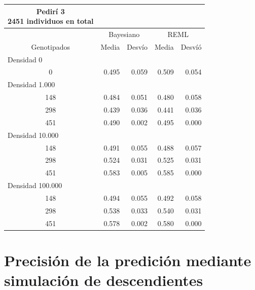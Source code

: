 \documentclass[11pt,spanish,a4paper,oneside,]{book} %
\begin{document}
\begin{longtable}{crrrr}
\caption*{
{\large Pedirí 3} \\ 
{\small 2451 individuos en total}
} \\ 
\toprule
 & \multicolumn{2}{c}{Bayesiano} & \multicolumn{2}{c}{REML} \\ 
 \cmidrule(lr){2-3} \cmidrule(lr){4-5}
Genotipados & Media & Desvío & Media & Desvíó \\ 
\midrule
\multicolumn{1}{l}{Densidad 0} \\ 
\midrule
0 & 0.495 & 0.059 & 0.509 & 0.054 \\ 
\midrule
\multicolumn{1}{l}{Densidad 1.000} \\ 
\midrule
148 & 0.484 & 0.051 & 0.480 & 0.058 \\ 
298 & 0.439 & 0.036 & 0.441 & 0.036 \\ 
451 & 0.490 & 0.002 & 0.495 & 0.000 \\ 
\midrule
\multicolumn{1}{l}{Densidad 10.000} \\ 
\midrule
148 & 0.491 & 0.055 & 0.488 & 0.057 \\ 
298 & 0.524 & 0.031 & 0.525 & 0.031 \\ 
451 & 0.583 & 0.005 & 0.585 & 0.000 \\ 
\midrule
\multicolumn{1}{l}{Densidad 100.000} \\ 
\midrule
148 & 0.494 & 0.055 & 0.492 & 0.058 \\ 
298 & 0.538 & 0.033 & 0.540 & 0.031 \\ 
451 & 0.578 & 0.002 & 0.580 & 0.000 \\ 
 \bottomrule
\end{longtable}

\hypertarget{precisiuxf3n-de-la-prediciuxf3n-mediante-simulaciuxf3n-de-descendientes-2}{%
\section{Precisión de la predición mediante simulación de descendientes}\label{precisiuxf3n-de-la-prediciuxf3n-mediante-simulaciuxf3n-de-descendientes-2}}
\end{document}
